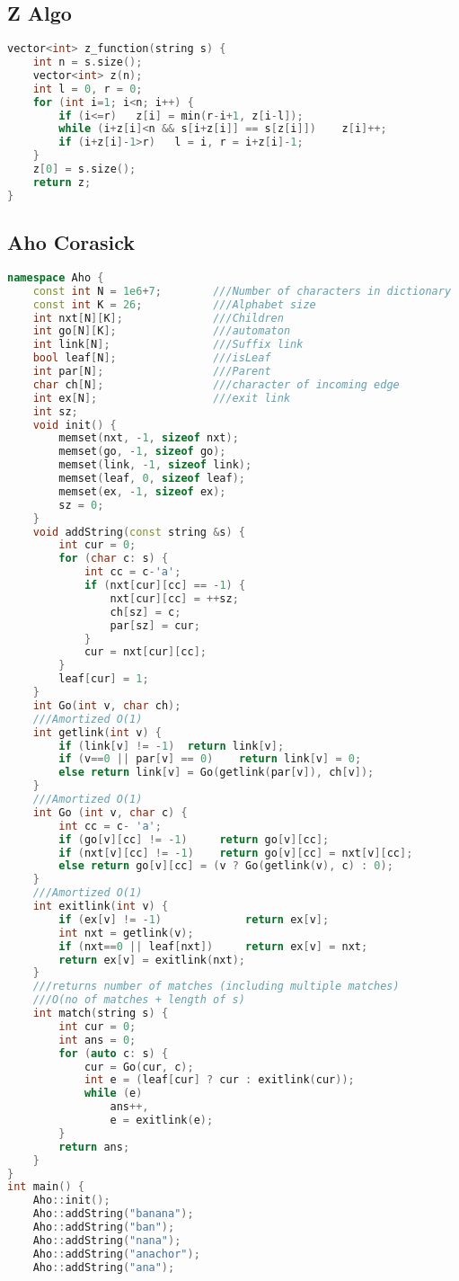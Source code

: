 \documentclass[10pt,a4paper,landscape]{article}
\begin{document}
\begin{multicols}{3}
\subsection{Z Algo}
\begin{lstlisting}[language=C++, breaklines=true]
vector<int> z_function(string s) {
    int n = s.size();
    vector<int> z(n);
    int l = 0, r = 0;
    for (int i=1; i<n; i++) {
        if (i<=r)   z[i] = min(r-i+1, z[i-l]);
        while (i+z[i]<n && s[i+z[i]] == s[z[i]])    z[i]++;
        if (i+z[i]-1>r)   l = i, r = i+z[i]-1;
    }
    z[0] = s.size();
    return z;
}
\end{lstlisting}

\subsection{Aho Corasick}
\begin{lstlisting}[language=C++, breaklines=true]
namespace Aho {
    const int N = 1e6+7;        ///Number of characters in dictionary
    const int K = 26;           ///Alphabet size
    int nxt[N][K];              ///Children
    int go[N][K];               ///automaton
    int link[N];                ///Suffix link
    bool leaf[N];               ///isLeaf
    int par[N];                 ///Parent
    char ch[N];                 ///character of incoming edge
    int ex[N];                  ///exit link
    int sz;
    void init() {
        memset(nxt, -1, sizeof nxt);
        memset(go, -1, sizeof go);
        memset(link, -1, sizeof link);
        memset(leaf, 0, sizeof leaf);
        memset(ex, -1, sizeof ex);
        sz = 0;
    }
    void addString(const string &s) {
        int cur = 0;
        for (char c: s) {
            int cc = c-'a';
            if (nxt[cur][cc] == -1) {
                nxt[cur][cc] = ++sz;
                ch[sz] = c;
                par[sz] = cur;
            }
            cur = nxt[cur][cc];
        }
        leaf[cur] = 1;
    }
    int Go(int v, char ch);
    ///Amortized O(1)
    int getlink(int v) {
        if (link[v] != -1)  return link[v];
        if (v==0 || par[v] == 0)    return link[v] = 0;
        else return link[v] = Go(getlink(par[v]), ch[v]);
    }
    ///Amortized O(1)
    int Go (int v, char c) {
        int cc = c- 'a';
        if (go[v][cc] != -1)     return go[v][cc];
        if (nxt[v][cc] != -1)    return go[v][cc] = nxt[v][cc];
        else return go[v][cc] = (v ? Go(getlink(v), c) : 0);
    }
    ///Amortized O(1)
    int exitlink(int v) {
        if (ex[v] != -1)             return ex[v];
        int nxt = getlink(v);
        if (nxt==0 || leaf[nxt])     return ex[v] = nxt;
        return ex[v] = exitlink(nxt);
    }
    ///returns number of matches (including multiple matches)
    ///O(no of matches + length of s)
    int match(string s) {
        int cur = 0;
        int ans = 0;
        for (auto c: s) {
            cur = Go(cur, c);
            int e = (leaf[cur] ? cur : exitlink(cur));
            while (e)
                ans++,
                e = exitlink(e);
        }
        return ans;
    }
}
int main() {
    Aho::init();
    Aho::addString("banana");
    Aho::addString("ban");
    Aho::addString("nana");
    Aho::addString("anachor");
    Aho::addString("ana");


\end{lstlisting}
\end{multicols}
\end{document}
